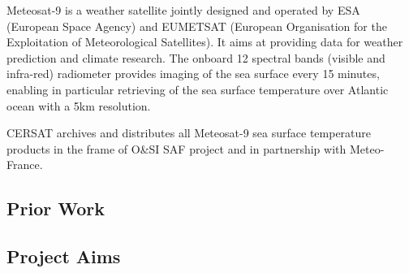 Meteosat-9 is a weather satellite jointly designed and operated by ESA (European Space Agency) and EUMETSAT (European Organisation for the Exploitation of Meteorological Satellites). It aims at providing data for weather prediction and climate research. The onboard 12 spectral bands (visible and infra-red) radiometer provides imaging of the sea surface every 15 minutes, enabling in particular retrieving of the sea surface temperature over Atlantic ocean with a 5km resolution.

CERSAT archives and distributes all Meteosat-9 sea surface temperature products in the frame of O&SI SAF project and in partnership with Meteo-France.










\subsection{Prior Work}

\subsection{Project Aims}
